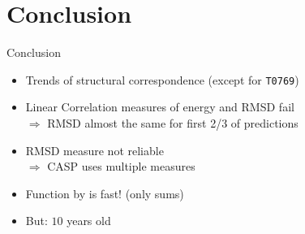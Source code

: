 \section{Conclusion}

\begin{frame}{Conclusion}
    \begin{itemize}[<+->]
        \item Trends of structural correspondence (except for \texttt{T0769})
        \item Linear Correlation measures of energy and RMSD fail\\
        $\Rightarrow$ RMSD almost the same for first 2/3 of predictions
        \item RMSD measure not reliable\\
        $\Rightarrow$ CASP uses multiple measures
        \item Function by \cite{Zhang1997} is fast! (only sums)
        \item But: $10$ years old
    \end{itemize}
\end{frame}
